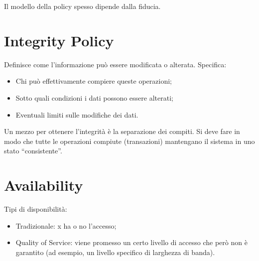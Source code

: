 Il modello della policy spesso dipende dalla fiducia.

\section{Integrity Policy}

Definisce come l’informazione può essere modificata o alterata.
Specifica:
\begin{itemize}
    \item Chi può effettivamente compiere queste operazioni;
    \item Sotto quali condizioni i dati possono essere alterati;
    \item Eventuali limiti sulle modifiche dei dati.
\end{itemize}

Un mezzo per ottenere l’integrità è la separazione dei compiti.
Si deve fare in modo che tutte le operazioni compiute (transazioni) mantengano il sistema in uno
stato “consistente”.

\section{Availability}

Tipi di disponibilità:
\begin{itemize}
    \item Tradizionale: x ha o no l’accesso;
    \item Quality of Service: viene promesso un certo livello di accesso
          che però non è garantito (ad esempio, un livello
          specifico di larghezza di banda).
\end{itemize}

